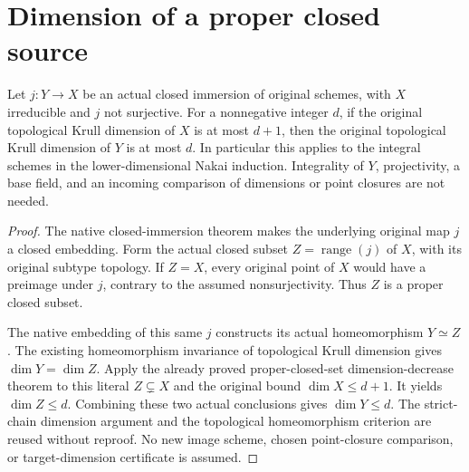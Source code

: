 \section{Dimension of a proper closed source}

\begin{theorem}
\label{thm:seshadri-original-proper-closed-map-dimension-drop}
\leanok
{}
Let $j:Y\to X$ be an actual closed immersion of original schemes, with
$X$ irreducible and $j$ not surjective. For a nonnegative integer $d$,
if the original topological Krull dimension of $X$ is at most $d+1$,
then the original topological Krull dimension of $Y$ is at most $d$.
In particular this applies to the integral schemes in the lower-dimensional
Nakai induction. Integrality of $Y$, projectivity, a base field, and an
incoming comparison of dimensions or point closures are not needed.
\end{theorem}
\begin{proof}
The native closed-immersion theorem makes the underlying original map
$j$ a closed embedding. Form the actual closed subset
$Z=\operatorname{range}(j)$ of $X$, with its original subtype topology.
If $Z=X$, every original point of $X$ would have a preimage under $j$,
contrary to the assumed nonsurjectivity. Thus $Z$ is a proper closed subset.

The native embedding of this same $j$ constructs its actual homeomorphism
$Y\simeq Z$. The existing homeomorphism invariance of topological Krull
dimension gives $\dim Y=\dim Z$. Apply the already proved proper-closed-set
dimension-decrease theorem to this literal $Z\subsetneq X$ and the
original bound $\dim X\leq d+1$. It yields $\dim Z\leq d$.
Combining these two actual conclusions gives $\dim Y\leq d$.
The strict-chain dimension argument and the topological homeomorphism
criterion are reused without reproof. No new image scheme, chosen
point-closure comparison, or target-dimension certificate is assumed.
\end{proof}
